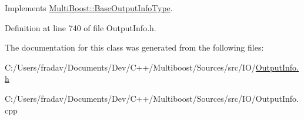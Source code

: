 Implements \hyperlink{classMultiBoost_1_1BaseOutputInfoType_aec8678cadeec12db720af8b482c63662}{Multi\-Boost\-::\-Base\-Output\-Info\-Type}.



Definition at line 740 of file Output\-Info.\-h.



The documentation for this class was generated from the following files\-:\begin{DoxyCompactItemize}
\item 
C\-:/\-Users/fradav/\-Documents/\-Dev/\-C++/\-Multiboost/\-Sources/src/\-I\-O/\hyperlink{OutputInfo_8h}{Output\-Info.\-h}\item 
C\-:/\-Users/fradav/\-Documents/\-Dev/\-C++/\-Multiboost/\-Sources/src/\-I\-O/Output\-Info.\-cpp\end{DoxyCompactItemize}
